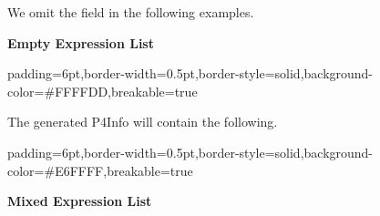 \documentclass[11pt]{article}
\begin{document}
{%
\noindent{}We omit the  field in the following examples.%

\textbf{Empty Expression List}%

\begin{mdbmargintb}{6pt}{6pt}%
\begin{mdblock}{padding=6pt,border-width=0.5pt,border-style=solid,background-color=\#FFFFDD,breakable=true}%
\begin{mdpre}%
\end{mdpre}%
\end{mdblock}%
\end{mdbmargintb}%

\noindent{}The generated P4Info will contain the following.%

\begin{mdbmargintb}{6pt}{6pt}%
\begin{mdblock}{padding=6pt,border-width=0.5pt,border-style=solid,background-color=\#E6FFFF,breakable=true}%
\begin{mdpre}%
\end{mdpre}%
\end{mdblock}%
\end{mdbmargintb}%

\noindent{}\textbf{Mixed Expression List}%

}
\end{document}
